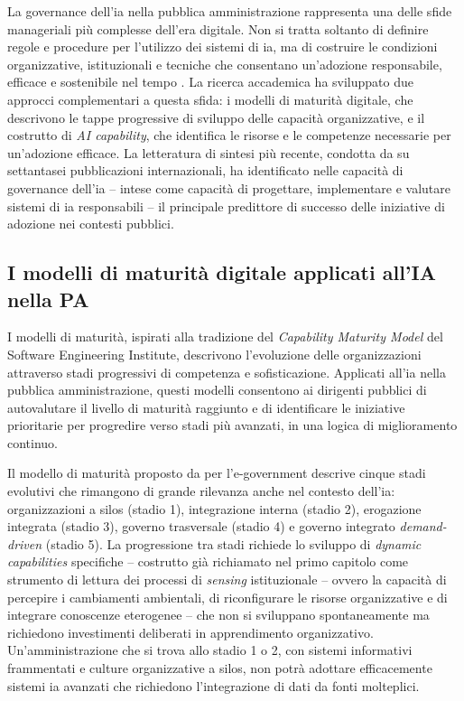 La governance dell'\gls{ia} nella pubblica amministrazione rappresenta una delle sfide manageriali più complesse dell'era digitale. Non si tratta soltanto di definire regole e procedure per l'utilizzo dei sistemi di \gls{ia}, ma di costruire le condizioni organizzative, istituzionali e tecniche che consentano un'adozione responsabile, efficace e sostenibile nel tempo \parencite{Wirtz2020}. La ricerca accademica ha sviluppato due approcci complementari a questa sfida: i modelli di maturità digitale, che descrivono le tappe progressive di sviluppo delle capacità organizzative, e il costrutto di \textit{AI capability}, che identifica le risorse e le competenze necessarie per un'adozione efficace. La letteratura di sintesi più recente, condotta da \textcite{Zuiderwijk2021} su settantasei pubblicazioni internazionali, ha identificato nelle capacità di governance dell'\gls{ia} -- intese come capacità di progettare, implementare e valutare sistemi di \gls{ia} responsabili -- il principale predittore di successo delle iniziative di adozione nei contesti pubblici.

\subsection{I modelli di maturità digitale applicati all'IA nella PA}

I modelli di maturità, ispirati alla tradizione del \textit{Capability Maturity Model} del Software Engineering Institute, descrivono l'evoluzione delle organizzazioni attraverso stadi progressivi di competenza e sofisticazione. Applicati all'\gls{ia} nella pubblica amministrazione, questi modelli consentono ai dirigenti pubblici di autovalutare il livello di maturità raggiunto e di identificare le iniziative prioritarie per progredire verso stadi più avanzati, in una logica di miglioramento continuo.

Il modello di maturità proposto da \textcite{Klievink2009} per l'e-government descrive cinque stadi evolutivi che rimangono di grande rilevanza anche nel contesto dell'\gls{ia}: organizzazioni a silos (stadio 1), integrazione interna (stadio 2), erogazione integrata (stadio 3), governo trasversale (stadio 4) e governo integrato \textit{demand-driven} (stadio 5). La progressione tra stadi richiede lo sviluppo di \textit{dynamic capabilities} specifiche -- costrutto già richiamato nel primo capitolo come strumento di lettura dei processi di \textit{sensing} istituzionale \parencite{Teece2007} -- ovvero la capacità di percepire i cambiamenti ambientali, di riconfigurare le risorse organizzative e di integrare conoscenze eterogenee -- che non si sviluppano spontaneamente ma richiedono investimenti deliberati in apprendimento organizzativo. Un'amministrazione che si trova allo stadio 1 o 2, con sistemi informativi frammentati e culture organizzative a silos, non potrà adottare efficacemente sistemi \gls{ia} avanzati che richiedono l'integrazione di dati da fonti molteplici.


